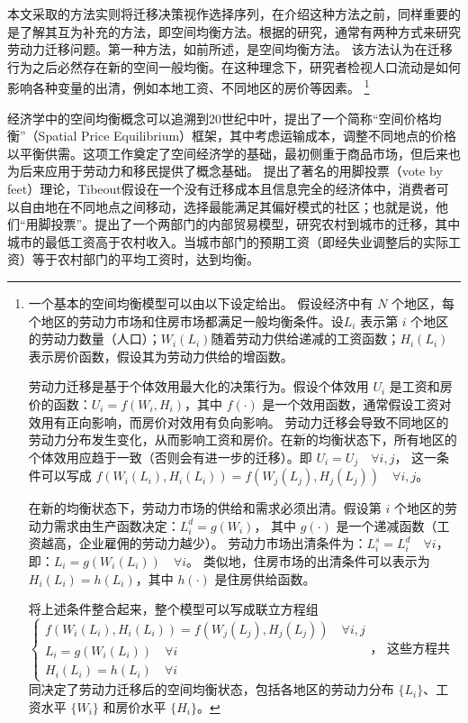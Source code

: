 \documentclass[a4paper,12pt,oneside, fontset=mac]{ctexbook} %
\begin{document}
本文采取的方法实则将迁移决策视作选择序列，在介绍这种方法之前，同样重要的是了解其互为补充的方法，即空间均衡方法。根据\cite{jiaEconomicsInternalMigration2023}的研究，通常有两种方式来研究劳动力迁移问题。第一种方法，如前所述，是空间均衡方法。
该方法认为在迁移行为之后必然存在新的空间一般均衡。在这种理念下，研究者检视人口流动是如何影响各种变量的出清，例如本地工资、不同地区的房价等因素。
\footnote{
一个基本的空间均衡模型可以由以下设定给出。
假设经济中有 $N$ 个地区，每个地区的劳动力市场和住房市场都满足一般均衡条件。设$ L_i $ 表示第 $ i $ 个地区的劳动力数量（人口）；$ W_i(L_i) $随着劳动力供给递减的工资函数；$ H_i(L_i) $ 表示房价函数，假设其为劳动力供给的增函数。

劳动力迁移是基于个体效用最大化的决策行为。假设个体效用 $ U_i $ 是工资和房价的函数：$U_i = f(W_i, H_i)$，其中 $ f(\cdot) $ 是一个效用函数，通常假设工资对效用有正向影响，而房价对效用有负向影响。
劳动力迁移会导致不同地区的劳动力分布发生变化，从而影响工资和房价。在新的均衡状态下，所有地区的个体效用应趋于一致（否则会有进一步的迁移）。即
$U_i = U_j \quad \forall i, j$，
这一条件可以写成
$f(W_i(L_i), H_i(L_i)) = f(W_j(L_j), H_j(L_j)) \quad \forall i, j$。

在新的均衡状态下，劳动力市场的供给和需求必须出清。假设第 $ i $ 个地区的劳动力需求由生产函数决定：$L_i^d = g(W_i)$，
其中 $ g(\cdot) $ 是一个递减函数（工资越高，企业雇佣的劳动力越少）。
劳动力市场出清条件为：$L_i^s = L_i^d \quad \forall i$，即：$L_i = g(W_i(L_i)) \quad \forall i$。
类似地，住房市场的出清条件可以表示为$H_i(L_i) = h(L_i)$，其中 $ h(\cdot) $ 是住房供给函数。

将上述条件整合起来，整个模型可以写成联立方程组
$\begin{cases}
f(W_i(L_i), H_i(L_i)) = f(W_j(L_j), H_j(L_j)) \quad \forall i, j \\
L_i = g(W_i(L_i)) \quad \forall i \\
H_i(L_i) = h(L_i) \quad \forall i
\end{cases}$，
这些方程共同决定了劳动力迁移后的空间均衡状态，包括各地区的劳动力分布 $ \{L_i\} $、工资水平 $ \{W_i\} $ 和房价水平 $ \{H_i\} $。
}

经济学中的空间均衡概念可以追溯到20世纪中叶，\cite{samuelsonSpatialPriceEquilibrium1952}提出了一个简称“空间价格均衡”（Spatial Price Equilibrium）框架，其中考虑运输成本，调整不同地点的价格以平衡供需。这项工作奠定了空间经济学的基础，最初侧重于商品市场，但后来也为后来应用于劳动力和移民提供了概念基础。
\cite{tieboutPureTheoryLocal1956}提出了著名的用脚投票（vote by feet）理论，Tibeout假设在一个没有迁移成本且信息完全的经济体中，消费者可以自由地在不同地点之间移动，选择最能满足其偏好模式的社区；也就是说，他们“用脚投票”。\cite{harrisMigrationUnemploymentDevelopment1970}提出了一个两部门的内部贸易模型，研究农村到城市的迁移，其中城市的最低工资高于农村收入。当城市部门的预期工资（即经失业调整后的实际工资）等于农村部门的平均工资时，达到均衡。
\end{document}
